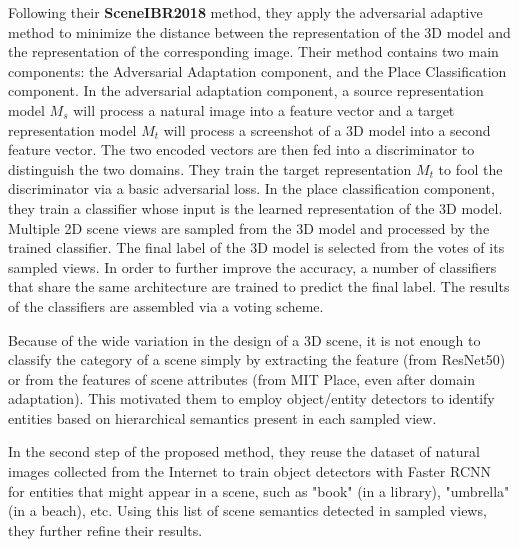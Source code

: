 \documentclass[../main.tex]{subfiles}
\begin{document}
	
	Following their \textbf{SceneIBR2018} method, they apply the adversarial 
	adaptive method to minimize the distance between the representation of the 
	3D model and the representation of the corresponding image. Their method 
	contains two main components: the Adversarial Adaptation component, and the 
	Place Classification component. In the adversarial adaptation component, a 
	source representation model $M_s$ will process a natural image into a 
	feature vector and a target representation model $M_t$ will process a 
	screenshot of a 3D model into a second feature vector. The two encoded 
	vectors are then fed into a discriminator to distinguish the two domains. 
	They train the target representation $M_t$ to fool the discriminator via a 
	basic adversarial loss. In the place classification component, they train a 
	classifier whose input is the learned representation of the 3D model. 
	Multiple 2D scene views are sampled from the 3D model and processed by the 
	trained classifier. The final label of the 3D model is selected from the 
	votes of its sampled views. In order to further improve the accuracy, a 
	number of classifiers that share the same architecture are trained to 
	predict the final label. The results of the classifiers are assembled via a 
	voting scheme.
	
	Because of the wide variation in the design of a 3D scene, it is not enough 
	to classify the category of a scene simply by extracting the feature (from 
	ResNet50) or from the features of scene attributes (from MIT Place, even 
	after domain adaptation). This motivated them to employ object/entity 
	detectors to identify entities based on hierarchical semantics present in 
	each sampled view.
	
	In the second step of the proposed method, they reuse the dataset of natural images collected from the Internet to train object detectors with Faster RCNN \cite{DBLP:journals/corr/RenHG015} for entities that might appear in a scene, such as "book" (in a library), "umbrella" (in a beach), etc. Using this  list of scene semantics detected in sampled views, they further refine their results.
\end{document}
